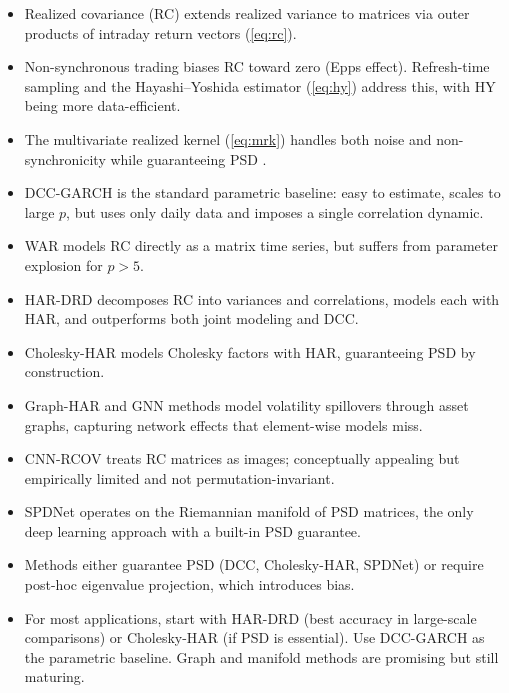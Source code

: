 \begin{itemize}[nosep]
  \item Realized covariance (RC) extends realized variance to matrices via
        outer products of intraday return vectors (\eqref{eq:rc}).
  \item Non-synchronous trading biases RC toward zero (Epps effect).
        Refresh-time sampling and the Hayashi--Yoshida estimator
        (\eqref{eq:hy}) address this, with HY being more data-efficient.
  \item The multivariate realized kernel (\eqref{eq:mrk}) handles both noise
        and non-synchronicity while guaranteeing PSD
        \citep{BarndorffNielsenHansenLundeShephard2011}.
  \item DCC-GARCH \citep{Engle2002DCC} is the standard parametric baseline:
        easy to estimate, scales to large $p$, but uses only daily data and
        imposes a single correlation dynamic.
  \item WAR models RC directly as a matrix time series, but suffers from
        parameter explosion for $p > 5$.
  \item HAR-DRD \citep{BollerslevPattonQuaedvlieg2018} decomposes RC into
        variances and correlations, models each with HAR, and outperforms
        both joint modeling and DCC.
  \item Cholesky-HAR \citep{ChiriacVoev2011} models Cholesky factors with HAR,
        guaranteeing PSD by construction.
  \item Graph-HAR \citep{ZhangPuCucuringuDong2024} and GNN methods
        \citep{ZhangCucuringuDong2023} model volatility spillovers through
        asset graphs, capturing network effects that element-wise models miss.
  \item CNN-RCOV treats RC matrices as images; conceptually appealing but
        empirically limited and not permutation-invariant.
  \item SPDNet operates on the Riemannian manifold of PSD matrices, the only
        deep learning approach with a built-in PSD guarantee.
  \item Methods either guarantee PSD (DCC, Cholesky-HAR, SPDNet) or require
        post-hoc eigenvalue projection, which introduces bias.
  \item For most applications, start with HAR-DRD (best accuracy in large-scale
        comparisons) or Cholesky-HAR (if PSD is essential). Use DCC-GARCH as
        the parametric baseline. Graph and manifold methods are promising but
        still maturing.
\end{itemize}

